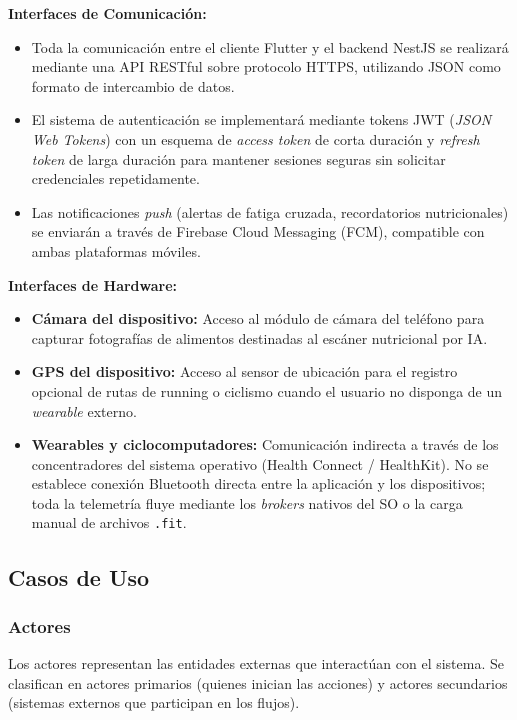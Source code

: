 \documentclass[12pt]{article}
\begin{document}
\textbf{Interfaces de Comunicación:}
\begin{itemize}
    \item Toda la comunicación entre el cliente Flutter y el backend NestJS se realizará mediante una API RESTful sobre protocolo HTTPS, utilizando JSON como formato de intercambio de datos.
    \item El sistema de autenticación se implementará mediante tokens JWT (\textit{JSON Web Tokens}) con un esquema de \textit{access token} de corta duración y \textit{refresh token} de larga duración para mantener sesiones seguras sin solicitar credenciales repetidamente.
    \item Las notificaciones \textit{push} (alertas de fatiga cruzada, recordatorios nutricionales) se enviarán a través de Firebase Cloud Messaging (FCM), compatible con ambas plataformas móviles.
\end{itemize}

\textbf{Interfaces de Hardware:}
\begin{itemize}
    \item \textbf{Cámara del dispositivo:} Acceso al módulo de cámara del teléfono para capturar fotografías de alimentos destinadas al escáner nutricional por IA.
    \item \textbf{GPS del dispositivo:} Acceso al sensor de ubicación para el registro opcional de rutas de running o ciclismo cuando el usuario no disponga de un \textit{wearable} externo.
    \item \textbf{Wearables y ciclocomputadores:} Comunicación indirecta a través de los concentradores del sistema operativo (Health Connect / HealthKit). No se establece conexión Bluetooth directa entre la aplicación y los dispositivos; toda la telemetría fluye mediante los \textit{brokers} nativos del SO o la carga manual de archivos \texttt{.fit}.
\end{itemize}
\newpage
\subsection{Casos de Uso}
\subsubsection{Actores}
Los actores representan las entidades externas que interactúan con el sistema. Se clasifican en actores primarios (quienes inician las acciones) y actores secundarios (sistemas externos que participan en los flujos).
\end{document}
